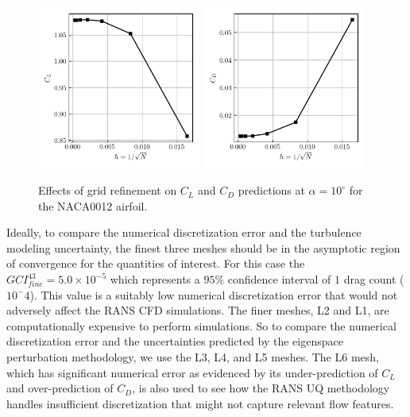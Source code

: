 \begin{figure}
\center
\subfigure%
  {\includegraphics[width=0.48\textwidth]{code/image_gen/naca0012/images/naca0012_CL_tmr_mesh_convergence.png}}
\subfigure%
  {\includegraphics[width=0.48\textwidth]{code/image_gen/naca0012/images/naca0012_CD_tmr_mesh_convergence.png}}
\caption{Effects of grid refinement on $C_L$ and $C_D$ predictions at $\alpha = 10^\circ$ for the NACA0012 airfoil.}\label{fig:naca0012_mesh_convergence}
\end{figure}

Ideally, to compare the numerical discretization error and the turbulence modeling uncertainty, the finest three meshes should be in the asymptotic region of convergence for the quantities of interest.
For this case the $GCI_{fine}^{43} = 5.0 \times 10^{-5}$ which represents a $95\%$ confidence interval of $1$ drag count ($10^-4$). 
This value is a suitably low numerical discretization error that would not adversely affect the RANS CFD simulations. 
The finer meshes, L2 and L1, are computationally expensive to perform simulations.
So to compare the numerical discretization error and the uncertainties predicted by the eigenspace perturbation methodology, we use the L3, L4, and L5 meshes. 
The L6 mesh, which has significant numerical error as evidenced by its under-prediction of $C_L$ and over-prediction of $C_D$, is also used to see how the RANS UQ methodology handles insufficient discretization that might not capture relevant flow features. 

